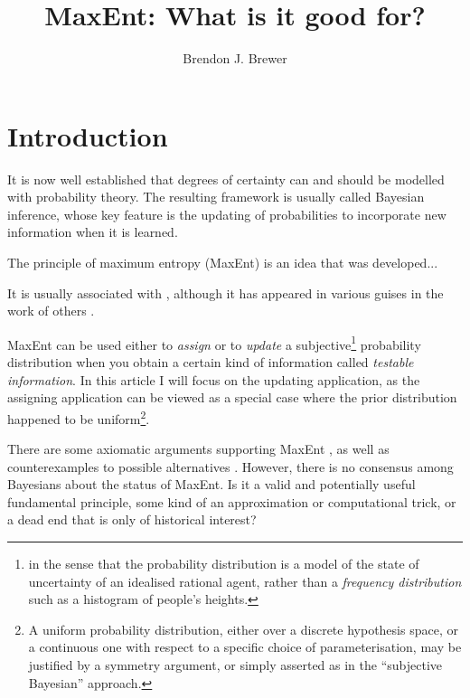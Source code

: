 \documentclass[a4paper, 11pt]{article}
\title{MaxEnt: What is it good for?}
\author{Brendon J. Brewer}
\begin{document}
\maketitle


\section{Introduction}
It is now well established that degrees of certainty can and should be modelled
with probability theory. The resulting framework is usually called Bayesian
inference, whose key feature is the updating of probabilities to incorporate
new information when it is learned.

The principle of maximum entropy (MaxEnt) is an idea that was developed...

It is usually associated with \citet{jaynes}, although it has appeared in
various guises in the work of others \citep[e.g.][]{gibbs, boltzmann, shannon}.

MaxEnt can be used either to {\it assign} or to {\it update} a
subjective\footnote{in the sense that the probability distribution is a model
of the state of uncertainty of an idealised rational agent, rather than
a {\it frequency distribution} such as a histogram of people's heights.}
probability distribution when you obtain a certain kind of information
called {\it testable information}. In this article I will focus on the
updating application, as the assigning application can be viewed as a special
case where the prior distribution happened to be
uniform\footnote{A uniform probability distribution, either over a discrete
hypothesis space, or a continuous one with respect to a specific choice of
parameterisation, may be justified by a symmetry argument, or simply asserted
as in the ``subjective Bayesian'' approach.}.

There are some axiomatic arguments supporting MaxEnt
\citep[e.g.][]{shore_johnson, 2006AIPC..872...31C, 2010arXiv1008.4831K},
as well as counterexamples to possible alternatives \citep[e.g.][]{presse}.
However, there is no consensus among Bayesians about the status of MaxEnt. Is
it a valid and potentially useful fundamental principle, some kind of an
approximation or computational trick, or a dead end that is only of
historical interest?
\end{document}
